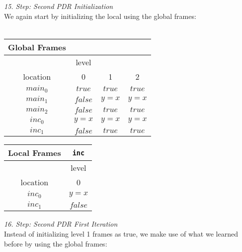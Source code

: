 \documentclass{article}
\begin{document}
	\textsl{15. Step: Second PDR Initialization} \\
	We again start by initializing the local using the global frames: \\ \\
	\begin{minipage}{.4\textwidth}
		\setlength\tabcolsep{0.35em}
		\begin{center}
			\begin{tabu}{cccc}
				Global Frames \\
				\toprule
				& level \\
				\cmidrule(lr){2-4}
				location & 0 & 1 & 2 \\
				$main_0$ & $true$ & $true$ & $true$  \\
				$main_1$ & $false$ & $y = x$ & $y = x$\\
				$main_2$ & $false$ & $true$ & $true$ \\
				$inc_0$ & $y = x$ & $y = x$ & $y = x$ \\
				$inc_1$ & $false$ & $true$ & $true$\\
				\bottomrule
			\end{tabu}
		\end{center}
	\end{minipage}
	\hfill
	\begin{minipage}{.5\textwidth}
		\setlength\tabcolsep{0.35em}
		\begin{center}
			\begin{tabu}{cc}
				Local Frames & \texttt{inc}\\
				\toprule
				& level \\
				\cmidrule(lr){2-2}
				location & 0  \\
				\cmidrule{1-2}
				$inc_0$ & $y = x$  \\
				$inc_1$ & $false$ \\
				\bottomrule
			\end{tabu}
		\end{center}	
	\end{minipage} 

\vspace*{2em}

\textsl{16. Step: Second PDR First Iteration} \\
Instead of initializing level 1 frames as true, we make use of what we learned before by using the global frames: \\
\end{document}

